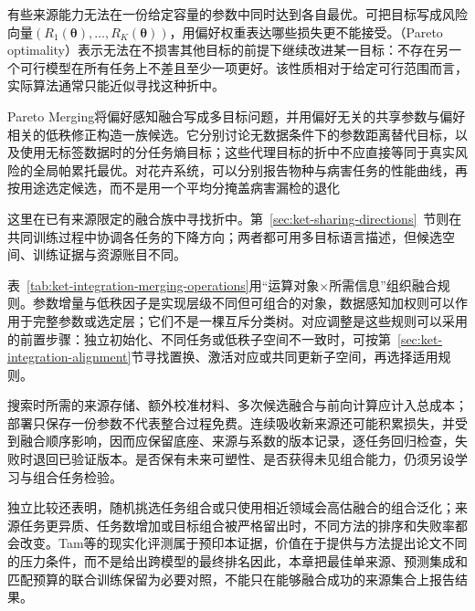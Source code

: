 有些来源能力无法在一份给定容量的参数中同时达到各自最优。可把目标写成风险向量$(R_1(\bm{\theta}),\ldots,R_K(\bm{\theta}))$，用偏好权重表达哪些损失更不能接受。（Pareto optimality）表示无法在不损害其他目标的前提下继续改进某一目标：不存在另一个可行模型在所有任务上不差且至少一项更好。该性质相对于给定可行范围而言，实际算法通常只能近似寻找这种折中。

Pareto Merging将偏好感知融合写成多目标问题，并用偏好无关的共享参数与偏好相关的低秩修正构造一族候选。它分别讨论无数据条件下的参数距离替代目标，以及使用无标签数据时的分任务熵目标；这些代理目标的折中不应直接等同于真实风险的全局帕累托最优。对花卉系统，可以分别报告物种与病害任务的性能曲线，再按用途选定候选，而不是用一个平均分掩盖病害漏检的退化

这里在已有来源限定的融合族中寻找折中。第~\ref{sec:ket-sharing-directions}~节则在共同训练过程中协调各任务的下降方向；两者都可用多目标语言描述，但候选空间、训练证据与资源账目不同。

表~\ref{tab:ket-integration-merging-operations}用“运算对象×所需信息”组织融合规则。参数增量与低秩因子是实现层级不同但可组合的对象，数据感知加权则可以作用于完整参数或选定层；它们不是一棵互斥分类树。对应调整是这些规则可以采用的前置步骤：独立初始化、不同任务或低秩子空间不一致时，可按第~\ref{sec:ket-integration-alignment}节寻找置换、激活对应或共同更新子空间，再选择适用规则。

搜索时所需的来源存储、额外校准材料、多次候选融合与前向计算应计入总成本；部署只保存一份参数不代表整合过程免费。连续吸收新来源还可能积累损失，并受到融合顺序影响，因而应保留底座、来源与系数的版本记录，逐任务回归检查，失败时退回已验证版本。是否保有未来可塑性、是否获得未见组合能力，仍须另设学习与组合任务检验。

独立比较还表明，随机挑选任务组合或只使用相近领域会高估融合的组合泛化；来源任务更异质、任务数增加或目标组合被严格留出时，不同方法的排序和失败率都会改变。Tam等的现实化评测属于预印本证据，价值在于提供与方法提出论文不同的压力条件，而不是给出跨模型的最终排名因此，本章把最佳单来源、预测集成和匹配预算的联合训练保留为必要对照，不能只在能够融合成功的来源集合上报告结果。

